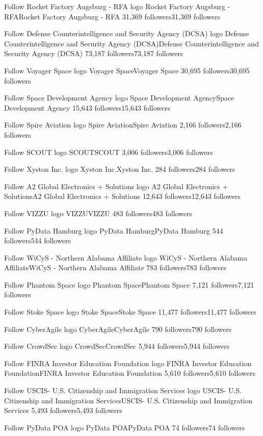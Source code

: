 Follow
Rocket Factory Augsburg - RFA logo
Rocket Factory Augsburg - RFARocket Factory Augsburg - RFA
31,369 followers31,369 followers

Follow
Defense Counterintelligence and Security Agency (DCSA) logo
Defense Counterintelligence and Security Agency (DCSA)Defense Counterintelligence and Security Agency (DCSA)
73,187 followers73,187 followers

Follow
Voyager Space logo
Voyager SpaceVoyager Space
30,695 followers30,695 followers

Follow
Space Development Agency logo
Space Development AgencySpace Development Agency
15,643 followers15,643 followers

Follow
Spire Aviation logo
Spire AviationSpire Aviation
2,166 followers2,166 followers

Follow
SCOUT logo
SCOUTSCOUT
3,006 followers3,006 followers

Follow
Xyston Inc. logo
Xyston Inc.Xyston Inc.
284 followers284 followers

Follow
A2 Global Electronics + Solutions logo
A2 Global Electronics + SolutionsA2 Global Electronics + Solutions
12,643 followers12,643 followers

Follow
VIZZU logo
VIZZUVIZZU
483 followers483 followers

Follow
PyData Hamburg logo
PyData HamburgPyData Hamburg
544 followers544 followers

Follow
WiCyS -  Northern Alabama Affiliate logo
WiCyS - Northern Alabama AffiliateWiCyS - Northern Alabama Affiliate
783 followers783 followers

Follow
Phantom Space logo
Phantom SpacePhantom Space
7,121 followers7,121 followers

Follow
Stoke Space logo
Stoke SpaceStoke Space
11,477 followers11,477 followers

Follow
CyberAgile logo
CyberAgileCyberAgile
790 followers790 followers

Follow
CrowdSec logo
CrowdSecCrowdSec
5,944 followers5,944 followers

Follow
FINRA Investor Education Foundation logo
FINRA Investor Education FoundationFINRA Investor Education Foundation
5,610 followers5,610 followers

Follow
USCIS- U.S. Citizenship and Immigration Services logo
USCIS- U.S. Citizenship and Immigration ServicesUSCIS- U.S. Citizenship and Immigration Services
5,493 followers5,493 followers

Follow
PyData POA logo
PyData POAPyData POA
74 followers74 followers

